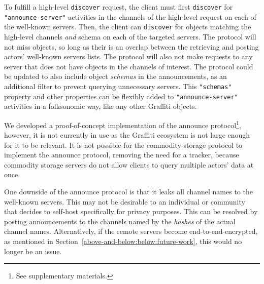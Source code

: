 To fulfill a high-level \texttt{discover} request,
the client must first \texttt{discover} for 
\texttt{"announce-server"} activities in the channels of
the high-level request
on each of the well-known servers.
Then, the client can \texttt{discover} for objects
matching the high-level channels \emph{and} schema on each of the targeted servers.
The protocol will not miss objects, so long as their
is an overlap between the retrieving and posting actors' well-known
servers lists.
The protocol will also not make requests to any server
that does not have objects in the channels of interest.
The protocol could be updated to also include object
\emph{schemas} in the announcements, as an additional
filter to prevent querying unnecessary servers.
This \texttt{"schemas"} property and other properties
can be flexibly added to \texttt{"announce-server"} activities
in a folksonomic way, like any other Graffiti objects.

We developed a proof-of-concept implementation of the announce protocol\footnote{
    See supplementary materials.
},
however, it is not currently in use as the Graffiti ecosystem is not
large enough for it to be relevant.
It is not possible for the commodity-storage protocol to implement
the announce protocol, removing the need for a tracker,
because commodity storage servers do not allow clients to
query multiple actors' data at once.

One downside of the announce protocol is that it leaks all
channel names to the well-known servers.
This may not be desirable to an individual or community that
decides to self-host specifically for privacy purposes.
This can be resolved by posting announcements to the channels
named by the \emph{hashes} of the actual channel names.
Alternatively, if the remote servers become end-to-end-encrypted,
as mentioned in Section~\ref{above-and-below:below:future-work},
this would no longer be an issue.




